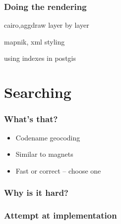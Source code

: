 \documentclass[14pt]{beamer}
\begin{document}

\begin{frame}
  \frametitle{Doing the rendering}
  cairo,aggdraw
  layer by layer
\end{frame}

\begin{frame}
  mapnik, xml styling
\end{frame}

\begin{frame}
  using indexes in postgis
\end{frame}

\section{Searching}

\begin{frame}
  \frametitle{What's that?}
  \begin{itemize}
  \item Codename geocoding
  \item Similar to magnets
  \item Fast or correct -- choose one
  \end{itemize}
\end{frame}

\begin{frame}
  \frametitle{Why is it hard?}
\end{frame}

\begin{frame}
  \frametitle{Attempt at implementation}
\end{frame}
\end{document}

